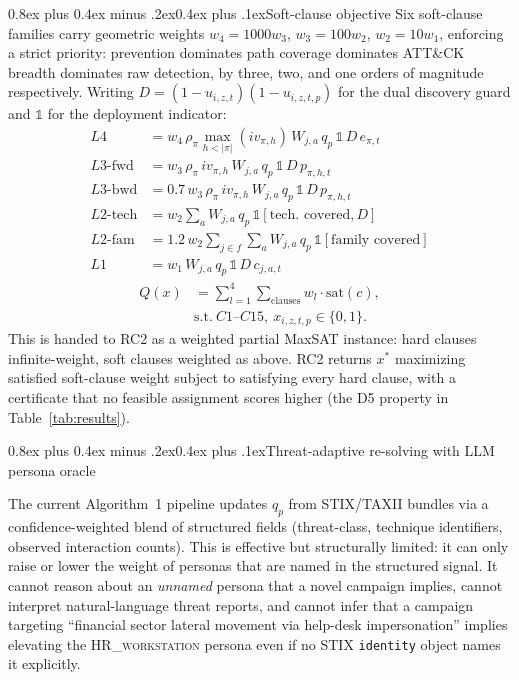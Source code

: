 \documentclass[10pt,twocolumn]{article}
\makeatletter
\renewcommand{\subsection}{\@startsection{subsection}{2}{0pt}%
  {0.8ex plus 0.4ex minus .2ex}{0.4ex plus .1ex}{\normalfont\bfseries}}
\makeatother
\begin{document}
\subsection{Soft-clause objective}
Six soft-clause families carry geometric weights $w_4{=}1000w_3$, $w_3{=}100w_2$, $w_2{=}10w_1$, enforcing a strict priority: prevention dominates path coverage dominates ATT\&CK breadth dominates raw detection, by three, two, and one orders of magnitude respectively. Writing $D=(1-u_{i,z,t})(1-u_{i,z,t,p})$ for the dual discovery guard and $\mathbb{1}$ for the deployment indicator:
\begin{align}
L4 &= w_4\,\rho_\pi\max_{h<|\pi|}(iv_{\pi,h})\,W_{j,a}\,q_p\,\mathbb{1}\,D\,e_{\pi,t}\\
L3\text{-fwd} &= w_3\,\rho_\pi\, iv_{\pi,h}\,W_{j,a}\,q_p\,\mathbb{1}\,D\,p_{\pi,h,t}\\
L3\text{-bwd} &= 0.7\,w_3\,\rho_\pi\, iv_{\pi,h}\,W_{j,a}\,q_p\,\mathbb{1}\,D\,p_{\pi,h,t}\\
L2\text{-tech} &= w_2\textstyle\sum_a W_{j,a}\,q_p\,\mathbb{1}[\text{tech.\ covered}, D]\\
L2\text{-fam} &= 1.2\,w_2\textstyle\sum_{j\in f}\sum_a W_{j,a}\,q_p\,\mathbb{1}[\text{family covered}]\\
L1 &= w_1\,W_{j,a}\,q_p\,\mathbb{1}\,D\,c_{j,a,t}
\end{align}
\[
\begin{split}
Q(x)&=\textstyle\sum_{l=1}^{4}\sum_{\text{clauses}} w_l\cdot \mathrm{sat}(c),\\
&\text{s.t.}\ C1\text{--}C15,\ x_{i,z,t,p}\in\{0,1\}.
\end{split}
\]
This is handed to RC2 as a weighted partial MaxSAT instance: hard clauses infinite-weight, soft clauses weighted as above. RC2 returns $x^*$ maximizing satisfied soft-clause weight subject to satisfying every hard clause, with a certificate that no feasible assignment scores higher (the D5 property in Table~\ref{tab:results}).

\subsection{Threat-adaptive re-solving with LLM persona oracle}\label{sec:llm}

The current Algorithm~1 pipeline updates $q_p$ from STIX/TAXII bundles via a confidence-weighted blend of structured fields (threat-class, technique identifiers, observed interaction counts). This is effective but structurally limited: it can only raise or lower the weight of personas that are named in the structured signal. It cannot reason about an \emph{unnamed} persona that a novel campaign implies, cannot interpret natural-language threat reports, and cannot infer that a campaign targeting ``financial sector lateral movement via help-desk impersonation'' implies elevating the \textsc{HR\_workstation} persona even if no STIX \texttt{identity} object names it explicitly.
\end{document}
